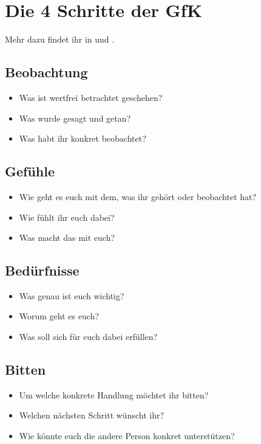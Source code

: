 \section{Die 4 Schritte der GfK}
\label{gfk-schritte}

Mehr dazu findet ihr in \cite[S. 213]{gfk-rosenberg} und \cite{gfk-dummies}.

\subsection{Beobachtung}

\begin{itemize}
 \item Was ist wertfrei betrachtet geschehen?
 \item Was wurde gesagt und getan?
 \item Was habt ihr konkret beobachtet?
\end{itemize}


\subsection{Gefühle}

\begin{itemize}
 \item Wie geht es euch mit dem, was ihr gehört oder beobachtet hat?
 \item Wie fühlt ihr euch dabei?
 \item Was macht das mit euch?
\end{itemize}


\subsection{Bedürfnisse}

\begin{itemize}
 \item Was genau ist euch wichtig?
 \item Worum geht es euch?
 \item Was soll sich für euch dabei erfüllen?
\end{itemize}


\subsection{Bitten}

\begin{itemize}
 \item Um welche konkrete Handlung möchtet ihr bitten?
 \item Welchen nächsten Schritt wünscht ihr?
 \item Wie könnte euch die andere Person konkret unterstützen?
\end{itemize}
